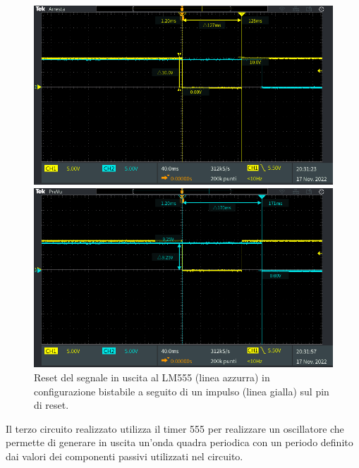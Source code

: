 \begin{figure}[tbh]
	\centering
	\begin{minipage}{.496\textwidth}
		\includegraphics[width=\linewidth]{./ImageFiles/Laboratorio 5/TEK00010.PNG}
	\end{minipage}
	\begin{minipage}{.496\textwidth}
		\includegraphics[width=\linewidth]{./ImageFiles/Laboratorio 5/TEK00011.PNG}
	\end{minipage}
	\caption{Reset del segnale in uscita al LM555 (linea azzurra) in configurazione bistabile a seguito di un impulso (linea gialla) sul pin di reset.}
	\label{fig:circuito_2_scope}
\end{figure}

\clearpage
Il terzo circuito realizzato utilizza il timer 555 per realizzare un oscillatore che permette di generare in uscita un'onda quadra periodica con un periodo definito dai valori dei componenti passivi utilizzati nel circuito.

